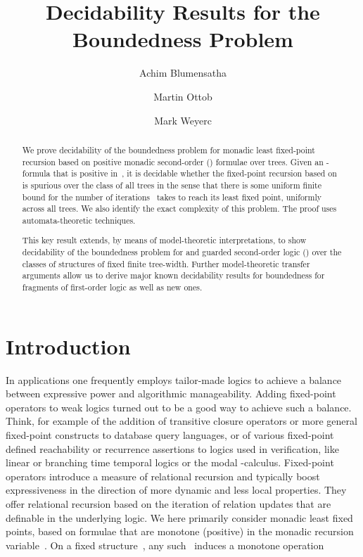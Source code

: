 \documentclass{LMCS}
\begin{document}
\title[Decidability Results for the Boundedness Problem]{Decidability Results for the Boundedness Problem}

\author[A.~Blumensath]{Achim Blumensath\rsuper a}
\address{{}Fachbereich Mathematik, Technische Universit\"at Darmstadt}

\author[M.~Otto]{Martin Otto\rsuper b}
\address{\vspace{-18 pt}}


\author[M.Weier]{Mark Weyer\rsuper c}
\address{{\lsuper c}\vspace{-12 pt}}

\begin{abstract}
We prove decidability of the boundedness problem for
monadic least fixed-point recursion based on
positive monadic second-order () formulae over trees.
Given an -formula  that is positive in~, it is decidable
whether the fixed-point recursion based on~ is spurious
over the class of all trees in the sense that there is some uniform
finite bound for the number of iterations ~takes
to reach its least fixed point, uniformly across all trees.
We also identify the exact complexity of this problem.
The proof uses automata-theoretic techniques.

This key result extends, by means of model-theoretic interpretations,
to show decidability of the boundedness problem for 
and guarded second-order logic () over the classes of structures
of fixed finite tree-width. Further model-theoretic transfer arguments
allow us to derive major known decidability results for boundedness
for fragments of first-order logic as well as new ones.
\end{abstract}

\maketitle

\section{Introduction}
\label{sect:intro}

In applications one frequently employs tailor-made logics
to achieve a balance between expressive power and algorithmic manageability.
Adding fixed-point operators to weak logics turned out to be a good way
to achieve such a balance.
Think, for example of the addition of transitive closure operators
or more general fixed-point constructs to database
query languages, or of various fixed-point defined reachability
or recurrence assertions to logics used in verification, like 
linear or branching time temporal logics or the modal -calculus.
Fixed-point operators introduce a measure of relational recursion and
typically boost expressiveness in the direction of more dynamic and
less local properties. They offer relational recursion based on the 
iteration of relation updates that are definable in the underlying logic.
We here primarily consider monadic least fixed points, based on formulae
 that are monotone (positive) in the
monadic recursion variable~.
On a fixed structure~,
any such~ induces a monotone operation
\end{document}

